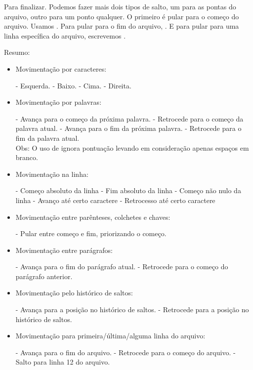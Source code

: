 \documentclass[a4paper, 12pt]{article}
\begin{document}
Para finalizar.
Podemos fazer mais dois tipos de salto, um para as pontas do arquivo, outro para um ponto qualquer.
O primeiro é pular para o começo do arquivo.
Usamos .
Para pular para o fim do arquivo, .
E para pular para uma linha específica do arquivo, escrevemos .

Resumo:
\begin{itemize}
    \item Movimentação por caracteres:

        \subitem {} - Esquerda.
        \subitem {} - Baixo.
        \subitem {} - Cima.
        \subitem {} - Direita.

    \item Movimentação por palavras:

        \subitem {}  - Avança para o começo da próxima palavra.
        \subitem {}  - Retrocede para o começo da palavra atual.
        \subitem {} - Avança para o fim da próxima palavra.
        \subitem {} - Retrocede para o fim da palavra atual.\\
        Obs: O uso de  ignora pontuação levando em consideração apenas espaços em branco.

    \item Movimentação na linha:

        \subitem {} - Começo absoluto da linha
        \subitem \vimcommand{\$} - Fim absoluto da linha
        \subitem \vimcommand{\^} - Começo não nulo da linha
        \subitem {} - Avanço até certo caractere
        \subitem {} - Retrocesso até certo caractere

    \item Movimentação entre parênteses, colchetes e chaves:

        \subitem \vimcommand{\%} - Pular entre começo e fim, priorizando o começo.

    \item Movimentação entre parágrafos:

        \subitem \vimcommand{\}} - Avança para o fim do parágrafo atual.
        \subitem \vimcommand{\{} - Retrocede para o começo do parágrafo anterior.

    \item Movimentação pelo histórico de saltos:

        \subitem {} - Avança para a posição no histórico de saltos.
        \subitem {} - Retrocede para a posição no histórico de saltos.

    \item Movimentação para primeira/última/alguma linha do arquivo:

        \subitem {} - Avança para o fim do arquivo.
        \subitem {} - Retrocede para o começo do arquivo.
        \subitem {} - Salto para linha 12 do arquivo.

\end{itemize}
    
\end{document}
